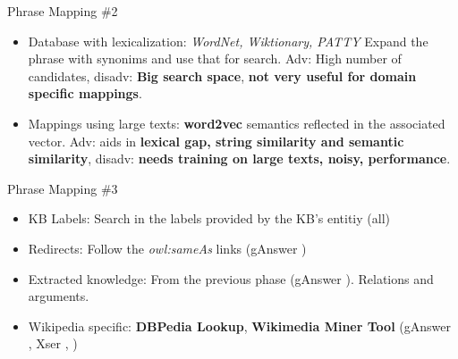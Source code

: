 \documentclass{beamer}
\begin{document}
\begin{frame}{Phrase Mapping \#2}
  \begin{card}
    \begin{itemize}
      \item Database with lexicalization: \textit{WordNet, Wiktionary, PATTY} Expand the phrase with synonims and use that for search. Adv: High number of candidates, disadv: \textbf{Big search space}, \textbf{not very useful for domain specific mappings}.
      \item Mappings using large texts: \textbf{word2vec} semantics reflected in the associated vector. Adv: aids in \textbf{lexical gap, string similarity and semantic similarity}, disadv: \textbf{needs training on large texts, noisy, performance}.
    \end{itemize}
  \end{card}
\end{frame}


\begin{frame}{Phrase Mapping \#3}
  \begin{card}
    \begin{itemize}
      \item KB Labels: Search in the labels provided by the KB's entitiy (all)
      \item Redirects: Follow the \textit{owl:sameAs} links (gAnswer \cite{zou2014a})
      \item Extracted knowledge: From the previous phase (gAnswer \cite{zou2014a}). Relations and arguments.
      \item Wikipedia specific: \textbf{DBPedia Lookup}, \textbf{Wikimedia Miner Tool} (gAnswer \cite{zou2014a}, Xser \cite{xu2014a}, \cite{zhu-a})
    \end{itemize}
  \end{card}
\end{frame}

\end{document}
